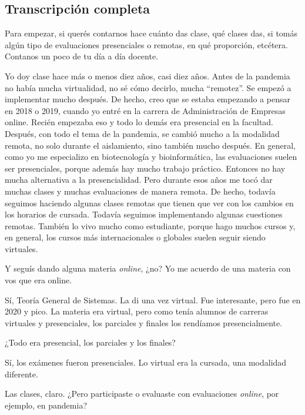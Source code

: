 \subsection*{Transcripción completa}
\begin{description}[leftmargin=0cm, labelsep=0.5cm, style=nextline]
\item[\textbf{Entrevistadores:}] Para empezar, si querés contarnos hace cuánto das clase, qué clases das, si tomás algún tipo de evaluaciones presenciales o remotas, en qué proporción, etcétera. Contanos un poco de tu día a día docente.
\item[\textbf{Entrevistado:}] Yo doy clase hace más o menos diez años, casi diez años. Antes de la pandemia no había mucha virtualidad, no sé cómo decirlo, mucha ``remotez''. Se empezó a implementar mucho después. De hecho, creo que se estaba empezando a pensar en 2018 o 2019, cuando yo entré en la carrera de Administración de Empresas online. Recién empezaba eso y todo lo demás era presencial en la facultad. Después, con todo el tema de la pandemia, se cambió mucho a la modalidad remota, no solo durante el aislamiento, sino también mucho después. En general, como yo me especializo en biotecnología y bioinformática, las evaluaciones suelen ser presenciales, porque además hay mucho trabajo práctico. Entonces no hay mucha alternativa a la presencialidad. Pero durante esos años me tocó dar muchas clases y muchas evaluaciones de manera remota. De hecho, todavía seguimos haciendo algunas clases remotas que tienen que ver con los cambios en los horarios de cursada. Todavía seguimos implementando algunas cuestiones remotas. También lo vivo mucho como estudiante, porque hago muchos cursos y, en general, los cursos más internacionales o globales suelen seguir siendo virtuales.
\item[\textbf{Entrevistadores:}] Y seguís dando alguna materia \textit{online}, ¿no? Yo me acuerdo de una materia con vos que era online.
\item[\textbf{Entrevistado:}] Sí, Teoría General de Sistemas. La di una vez virtual. Fue interesante, pero fue en 2020 y pico. La materia era virtual, pero como tenía alumnos de carreras virtuales y presenciales, los parciales y finales los rendíamos presencialmente.
\item[\textbf{Entrevistadores:}] ¿Todo era presencial, los parciales y los finales?
\item[\textbf{Entrevistado:}] Sí, los exámenes fueron presenciales. Lo virtual era la cursada, una modalidad diferente.
\item[\textbf{Entrevistadores:}] Las clases, claro. ¿Pero participaste o evaluaste con evaluaciones \textit{online}, por ejemplo, en pandemia?

\end{description}
